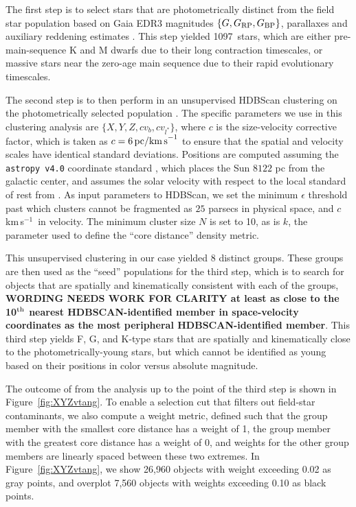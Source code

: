 \documentclass[12pt,twocolumn,linenumbers]{aastex63}
\newcommand{\npms}{1097} %
\newcommand{\kms}{\,km\,s$^{-1}$}
\begin{document}
The first step is to select stars that are photometrically distinct
from the field star population based on Gaia EDR3 magnitudes $\{G,
G_{\rm RP}, G_{\rm BP}\}$, parallaxes and auxiliary reddening
estimates \citep{lallement_gaia-2mass_2019}.  This step yielded \npms\
stars, which are either  pre-main-sequence K and M dwarfs due to their
long contraction timescales, or massive stars near the zero-age main
sequence due to their rapid evolutionary timescales.

The second step is to then perform in an unsupervised HDBScan
clustering on the photometrically selected population
\citep{campello_hierarchical_2015,mcinnes_hdbscan_2017}.  The specific
parameters we use in this clustering analysis are $\{ X, Y, Z, c v_b,
c v_{l^*} \} $, where $c$ is the size-velocity corrective factor,
which is taken as $c=6\,{\rm pc / km\,s}^{-1}$ to ensure that the
spatial and velocity scales have identical standard deviations.
Positions are computed assuming the \texttt{astropy v4.0} coordinate
standard \citep{astropy_2018}, which places the Sun $8122$ pc from the
galactic center, and assumes the solar velocity with respect to the
local standard of rest from \citet{schonrich_local_2010}.  As input
parameters to HDBScan, we set the minimum $\epsilon$ threshold past
which clusters cannot be fragmented as $25$ parsecs in physical space,
and $c$ \kms\ in velocity.  The minimum cluster size $N$ is set to 10,
as is $k$, the parameter used to define the ``core distance'' density
metric. 

This unsupervised clustering in our case yielded 8 distinct groups.
These groups are then used as the ``seed'' populations for the third
step, which is to search for objects that are spatially and
kinematically consistent with each of the groups, {\bf WORDING NEEDS
WORK FOR CLARITY at least as close to the 10$^{\rm th}$ nearest
HDBSCAN-identified member in space-velocity coordinates as the most
peripheral HDBSCAN-identified member}.  This third step yields F, G,
and K-type stars that are spatially and kinematically close to the
photometrically-young stars, but which cannot be identified as young
based on their positions in color versus absolute magnitude.

The outcome of from the analysis up to the point of the third step is
shown in Figure~\ref{fig:XYZvtang}.  
To enable a selection cut that filters out field-star contaminants, we
also compute a weight metric, defined such that the group member
with the smallest core distance has a weight of 1, the group member
with the greatest core distance has a weight of 0, and weights for the
other group members are linearly spaced between these two extremes.
In Figure~\ref{fig:XYZvtang}, we show 26{,}960 objects with weight
exceeding 0.02 as gray points, and overplot 7{,}560 objects with
weights exceeding 0.10 as black points.
\end{document}
